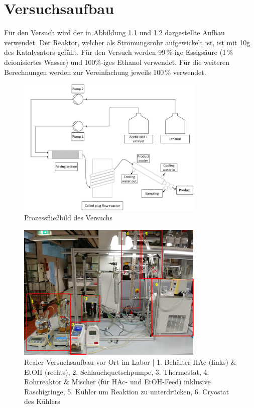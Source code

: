 \documentclass[12pt,liststotoc]{report}
\begin{document}
\chapter{Versuchsaufbau}

Für den Versuch wird der in Abbildung \ref{Prozessfliessbild} und \ref{Versuchsaufbau} dargestellte Aufbau verwendet. Der Reaktor, welcher als Strömungsrohr aufgewickelt ist, ist mit 10\;g des Katalysators gefüllt. Für den Versuch werden 99\,\%-ige Essigsäure (1\,\% deionisiertes Wasser) und 100\;\%-iges Ethanol verwendet. Für die weiteren Berechnungen werden zur Vereinfachung jeweils 100\,\% verwendet.

\begin{figure}[H]
\centering
\includegraphics[width=0.8\textwidth]{Graphics/Prozessfliessbild.png} 
\caption[Prozessfließbild des Versuchs]{Prozessfließbild des Versuchs \cite{Labor_Skript2018}}
\label{Prozessfliessbild}
\end{figure}
\noindent

\begin{figure}[H]
\centering
\includegraphics[width=0.8\textwidth]{Graphics/Versuchsaufbau_Veresterung.PNG} 
\caption[Realer Versuchsaufbau vor Ort im Labor]{Realer Versuchsaufbau vor Ort im Labor | 1. Behälter HAc (links) $\&$ EtOH (rechts), 2. Schlauchquetschpumpe, 3. Thermostat, 4. Rohrreaktor $\&$ Mischer (für HAc- und EtOH-Feed) inklusive Raschigringe, 5. Kühler um Reaktion zu unterdrücken, 6. Cryostat des Kühlers}
\label{Versuchsaufbau}
\end{figure}
\noindent
\end{document}
